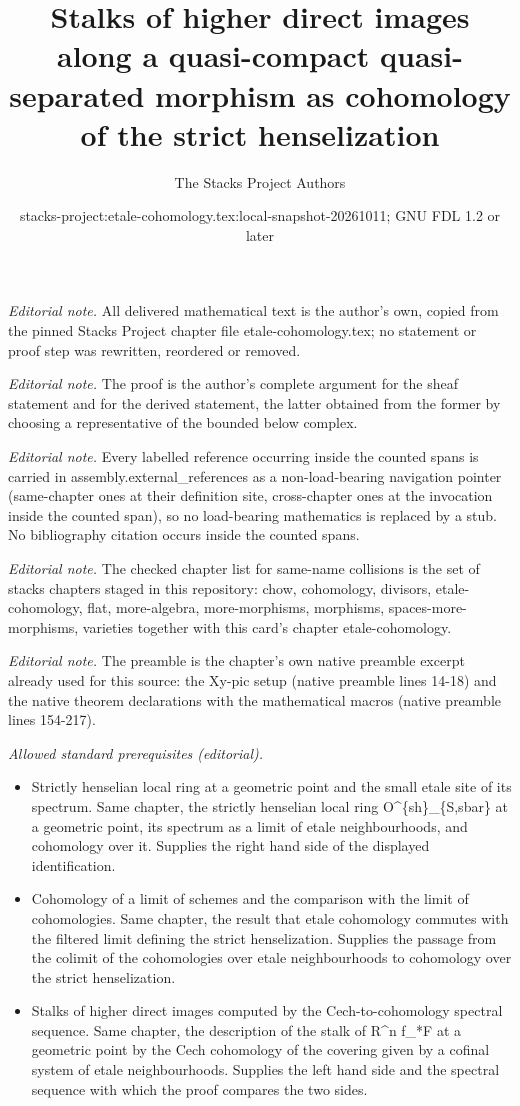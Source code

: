\documentclass[10pt,a4paper]{amsart}
\title{Stalks of higher direct images along a quasi-compact quasi-separated morphism as cohomology of the strict henselization}
\author{The Stacks Project Authors}
\date{stacks-project:etale-cohomology.tex:local-snapshot-20261011; GNU FDL 1.2 or later}
\theoremstyle{plain}
\theoremstyle{definition}
\theoremstyle{remark}
\numberwithin{equation}{subsection}
\begin{document}
\maketitle
\noindent\textit{Editorial note.} All delivered mathematical text is the author's own, copied from the pinned Stacks Project chapter file etale-cohomology.tex; no statement or proof step was rewritten, reordered or removed.\par\medskip
\noindent\textit{Editorial note.} The proof is the author's complete argument for the sheaf statement and for the derived statement, the latter obtained from the former by choosing a representative of the bounded below complex.\par\medskip
\noindent\textit{Editorial note.} Every labelled reference occurring inside the counted spans is carried in assembly.external\_references as a non-load-bearing navigation pointer (same-chapter ones at their definition site, cross-chapter ones at the invocation inside the counted span), so no load-bearing mathematics is replaced by a stub. No bibliography citation occurs inside the counted spans.\par\medskip
\noindent\textit{Editorial note.} The checked chapter list for same-name collisions is the set of stacks chapters staged in this repository: chow, cohomology, divisors, etale-cohomology, flat, more-algebra, more-morphisms, morphisms, spaces-more-morphisms, varieties together with this card's chapter etale-cohomology.\par\medskip
\noindent\textit{Editorial note.} The preamble is the chapter's own native preamble excerpt already used for this source: the Xy-pic setup (native preamble lines 14-18) and the native theorem declarations with the mathematical macros (native preamble lines 154-217).\par\medskip
\noindent\textit{Allowed standard prerequisites (editorial).}\begin{itemize}
\item Strictly henselian local ring at a geometric point and the small etale site of its spectrum. Same chapter, the strictly henselian local ring O\textasciicircum{}\{sh\}\_\{S,sbar\} at a geometric point, its spectrum as a limit of etale neighbourhoods, and cohomology over it. Supplies the right hand side of the displayed identification.
\item Cohomology of a limit of schemes and the comparison with the limit of cohomologies. Same chapter, the result that etale cohomology commutes with the filtered limit defining the strict henselization. Supplies the passage from the colimit of the cohomologies over etale neighbourhoods to cohomology over the strict henselization.
\item Stalks of higher direct images computed by the Cech-to-cohomology spectral sequence. Same chapter, the description of the stalk of R\textasciicircum{}n f\_*F at a geometric point by the Cech cohomology of the covering given by a cofinal system of etale neighbourhoods. Supplies the left hand side and the spectral sequence with which the proof compares the two sides.
\end{itemize}\medskip
\end{document}
